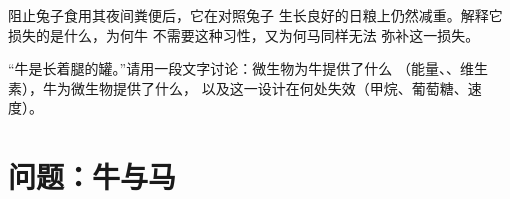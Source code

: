 \begin{exercise}[$\star\star\star$]\label{exo:b1:digestion-absorption:11}
阻止兔子食用其夜间粪便后，它在对照兔子
生长良好的日粮上仍然减重。解释它损失的是什么，为何牛
不需要这种习性，又为何马同样无法
弥补这一损失。
\end{exercise}

\begin{exercise}[$\star\star\star$]\label{exo:b1:digestion-absorption:12}
“牛是长着腿的罐。”请用一段文字讨论：微生物为牛提供了什么
（能量、、维生素），牛为微生物提供了什么，
以及这一设计在何处失效（甲烷、葡萄糖、速度）。
\end{exercise}

\section{问题：牛与马}

